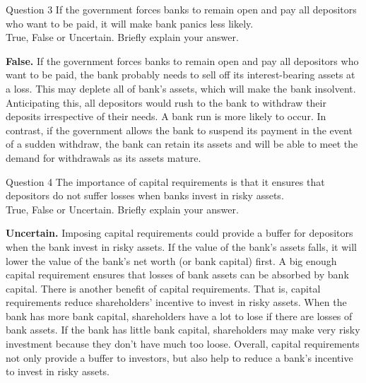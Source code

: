 \documentclass[a4paper]{article}
\newif\IfInSansMode
\numberwithin{equation}{section}
\numberwithin{figure}{section}
\begin{document}
	\begin{questionbox}{Question 3}
		If the government forces banks to remain open and pay all depositors who want to be paid, it will make bank panics less likely.\\
		True, False or Uncertain. Briefly explain your answer.
		\begin{explanationbox}
			\textbf{False.} If the government forces banks to remain open and pay all depositors who want to be paid, the bank probably needs to sell off its interest-bearing assets at a loss. This may deplete all of bank's assets, which will make the bank insolvent. Anticipating this, all depositors would rush to the bank to withdraw their deposits irrespective of their needs. A bank run is more likely to occur. In contrast, if the government allows the bank to suspend its payment in the event of a sudden withdraw, the bank can retain its assets and will be able to meet the demand for withdrawals as its assets mature.
	\end{explanationbox}
	\end{questionbox}
	\begin{questionbox}{Question 4}
		The importance of capital requirements is that it ensures that depositors do not suffer losses when banks invest in risky assets.\\
		True, False or Uncertain. Briefly explain your answer.
		\begin{explanationbox}
			\textbf{Uncertain.} Imposing capital requirements could provide a buffer for depositors when the bank invest in risky assets. If the value of the bank's assets falls, it will lower the value of the bank's net worth (or bank capital) first. A big enough capital requirement ensures that losses of bank assets can be absorbed by bank capital. There is another benefit of capital requirements. That is, capital requirements reduce shareholders' incentive to invest in risky assets. When the bank has more bank capital, shareholders have a lot to lose if there are losses of bank assets. If the bank has little bank capital, shareholders may make very risky investment because they don't have much too loose. Overall, capital requirements not only provide a buffer to investors, but also help to reduce a bank's incentive to invest in risky assets.
		\end{explanationbox}
	\end{questionbox}
\end{document}
